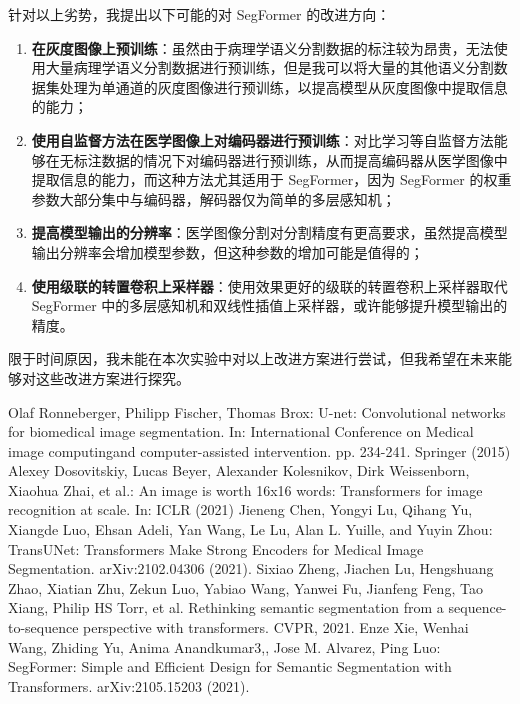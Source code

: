 \documentclass[hyperref,a4paper,UTF8]{ctexart}
\begin{document}
针对以上劣势，我提出以下可能的对 SegFormer 的改进方向：

\begin{enumerate}[itemsep=2pt,topsep=0pt,parsep=0pt]
    \item \textbf{在灰度图像上预训练}：虽然由于病理学语义分割数据的标注较为昂贵，无法使用大量病理学语义分割数据进行预训练，但是我可以将大量的其他语义分割数据集处理为单通道的灰度图像进行预训练，以提高模型从灰度图像中提取信息的能力；
    \item \textbf{使用自监督方法在医学图像上对编码器进行预训练}：对比学习等自监督方法能够在无标注数据的情况下对编码器进行预训练，从而提高编码器从医学图像中提取信息的能力，而这种方法尤其适用于 SegFormer，因为 SegFormer 的权重参数大部分集中与编码器，解码器仅为简单的多层感知机；
    \item \textbf{提高模型输出的分辨率}：医学图像分割对分割精度有更高要求，虽然提高模型输出分辨率会增加模型参数，但这种参数的增加可能是值得的；
    \item \textbf{使用级联的转置卷积上采样器}：使用效果更好的级联的转置卷积上采样器取代 SegFormer 中的多层感知机和双线性插值上采样器，或许能够提升模型输出的精度。
\end{enumerate}

限于时间原因，我未能在本次实验中对以上改进方案进行尝试，但我希望在未来能够对这些改进方案进行探究。


\begin{thebibliography}{99}
Olaf Ronneberger, Philipp Fischer, Thomas Brox: U-net: Convolutional networks for biomedical image segmentation. In: International Conference on Medical image computingand computer-assisted intervention. pp. 234-241. Springer (2015)
Alexey Dosovitskiy, Lucas Beyer, Alexander Kolesnikov, Dirk Weissenborn, Xiaohua Zhai, et al.: An image is worth 16x16 words: Transformers for image recognition at scale. In: ICLR (2021)
Jieneng Chen, Yongyi Lu, Qihang Yu, Xiangde Luo, Ehsan Adeli, Yan Wang, Le Lu, Alan L. Yuille, and Yuyin Zhou: TransUNet: Transformers Make Strong
Encoders for Medical Image Segmentation. arXiv:2102.04306 (2021).
Sixiao Zheng, Jiachen Lu, Hengshuang Zhao, Xiatian Zhu, Zekun Luo, Yabiao Wang, Yanwei Fu, Jianfeng Feng, Tao Xiang, Philip HS Torr, et al. Rethinking semantic segmentation from a sequence-to-sequence perspective with transformers. CVPR, 2021.
Enze Xie, Wenhai Wang, Zhiding Yu, Anima Anandkumar3,, Jose M. Alvarez, Ping Luo: SegFormer: Simple and Efficient Design for Semantic Segmentation with Transformers. arXiv:2105.15203 (2021).
\end{thebibliography}
\end{document}
